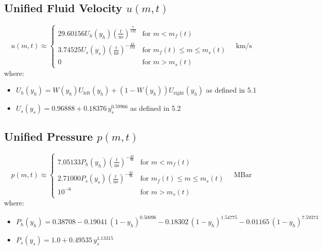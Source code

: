 \documentclass[11pt]{article}
\begin{document}
\subsection{Unified Fluid Velocity $u(m,t)$}
\begin{equation}
\boxed{
    u(m,t) \approx \begin{cases}
        29.60156 U_h(y_h) \left(\frac{t}{\text{ns}}\right)^{\frac{7}{192}} & \text{for } m < m_f(t) \\
        3.74525 U_s(y_s) \left(\frac{t}{\text{ns}}\right)^{-\frac{43}{192}} & \text{for } m_f(t) \le m \le m_s(t) \\
        0 & \text{for } m > m_s(t)
    \end{cases} \quad \text{km/s}
}
\end{equation}
where:
\begin{itemize}
    \item $U_h(y_h) = W(y_h) U_{\text{left}}(y_h) + (1-W(y_h)) U_{\text{right}}(y_h)$ as defined in 5.1 
    \item $U_s(y_s) = 0.96888 + 0.18376 \, y_s^{0.59966}$ as defined in 5.2 
\end{itemize}

\subsection{Unified Pressure $p(m,t)$}
\begin{equation}
\boxed{
    p(m,t) \approx \begin{cases}
        7.05133 P_h(y_h) \left(\frac{t}{\text{ns}}\right)^{-\frac{43}{96}} & \text{for } m < m_f(t) \\
        2.71000 P_s(y_s) \left(\frac{t}{\text{ns}}\right)^{-\frac{43}{96}} & \text{for } m_f(t) \le m \le m_s(t) \\
        10^{-6} & \text{for } m > m_s(t)
    \end{cases} \quad \text{MBar}
}
\end{equation}
where:
\begin{itemize}
    \item $P_h(y_h) = 0.38708 - 0.19041 \, (1-y_h)^{0.50096} - 0.18302 \, (1-y_h)^{1.54775} - 0.01165 \, (1-y_h)^{7.59373}$ 
    \item $P_s(y_s) = 1.0 + 0.49535 \, y_s^{1.13315}$ 
\end{itemize}
\end{document}
